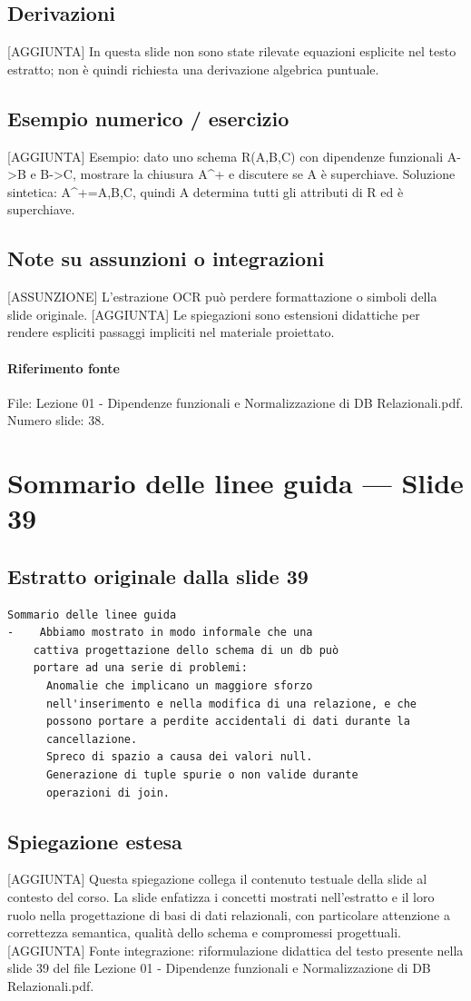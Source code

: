 \documentclass[11pt]{article}
\begin{document}
\subsection*{Derivazioni}
[AGGIUNTA] In questa slide non sono state rilevate equazioni esplicite nel testo estratto; non è quindi richiesta una derivazione algebrica puntuale.
\subsection*{Esempio numerico / esercizio}
[AGGIUNTA] Esempio: dato uno schema R(A,B,C) con dipendenze funzionali A->B e B->C, mostrare la chiusura A^+ e discutere se A è superchiave. Soluzione sintetica: A^+={A,B,C}, quindi A determina tutti gli attributi di R ed è superchiave.
\subsection*{Note su assunzioni o integrazioni}
[ASSUNZIONE] L'estrazione OCR può perdere formattazione o simboli della slide originale.
[AGGIUNTA] Le spiegazioni sono estensioni didattiche per rendere espliciti passaggi impliciti nel materiale proiettato.
\paragraph{Riferimento fonte} File: Lezione 01 - Dipendenze funzionali e Normalizzazione di DB Relazionali.pdf. Numero slide: 38.
\section{Sommario delle linee guida --- Slide 39}
\subsection*{Estratto originale dalla slide 39}
\begin{lstlisting}
Sommario delle linee guida
-    Abbiamo mostrato in modo informale che una
    cattiva progettazione dello schema di un db può
    portare ad una serie di problemi:
      Anomalie che implicano un maggiore sforzo
      nell'inserimento e nella modifica di una relazione, e che
      possono portare a perdite accidentali di dati durante la
      cancellazione.
      Spreco di spazio a causa dei valori null.
      Generazione di tuple spurie o non valide durante
      operazioni di join.
\end{lstlisting}
\subsection*{Spiegazione estesa}
[AGGIUNTA] Questa spiegazione collega il contenuto testuale della slide al contesto del corso. La slide enfatizza i concetti mostrati nell'estratto e il loro ruolo nella progettazione di basi di dati relazionali, con particolare attenzione a correttezza semantica, qualità dello schema e compromessi progettuali.
[AGGIUNTA] Fonte integrazione: riformulazione didattica del testo presente nella slide 39 del file Lezione 01 - Dipendenze funzionali e Normalizzazione di DB Relazionali.pdf.
\end{document}
